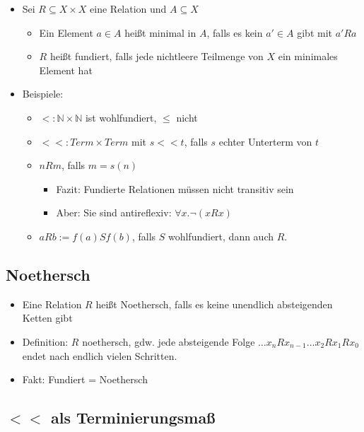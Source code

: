 \documentclass{scrartcl}
\begin{document}
\begin{itemize}
	\item Sei $ R \subseteq X \times X $ eine Relation und $ A \subseteq X $
	\begin{itemize}
		\item Ein Element $ a \in A $ heißt minimal in $ A $, falls es kein $ a' \in A $ gibt mit $ a' R a $
		\item $ R $ heißt fundiert, falls jede nichtleere Teilmenge von $ X $ ein minimales Element hat
	\end{itemize}
	\item Beispiele:
	\begin{itemize}
		\item $ < : \mathbb{N} \times \mathbb{N} $ ist wohlfundiert, $ \leq $ nicht
		\item $ << : Term \times Term $ mit $ s << t $, falls $ s $ echter Unterterm von $ t $
		\item $ n R m $, falls $ m = s(n) $
		\begin{itemize}
			\item Fazit: Fundierte Relationen müssen nicht transitiv sein
			\item Aber: Sie sind antireflexiv: $ \forall x.\neg(x R x) $
		\end{itemize}
		\item $ a R b := f(a) S f(b) $, falls $ S $ wohlfundiert, dann auch $ R $.
	\end{itemize}
\end{itemize}

\subsection{Noethersch}

\begin{itemize}
	\item Eine Relation $ R $ heißt Noethersch, falls es keine unendlich absteigenden Ketten gibt
	\item Definition: $ R $ noethersch, gdw. jede absteigende Folge $ \ldots x_n R x_{n-1} \ldots x_2 Rx_1Rx_0 $ endet nach endlich vielen Schritten.
	\item Fakt: Fundiert = Noethersch
\end{itemize}

\subsection{$ << $ als Terminierungsmaß}
\end{document}
